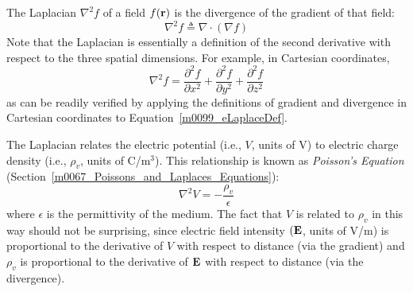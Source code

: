 

\label{m0099_The_Laplacian_Operator} %

The Laplacian $\nabla^2 f$ of a field $f({\bf r})$ is the divergence of the gradient of that field:
%
\begin{equation}
\nabla^2 f \triangleq \nabla\cdot\left(\nabla f\right)
\label{m0099_eLaplaceDef}
\end{equation}
%
Note that the Laplacian is essentially a definition of the second derivative with respect to the three spatial dimensions.
For example, in Cartesian coordinates,
%
\begin{equation}
\nabla^2 f= 
\frac{\partial^2 f}{\partial x^2}  
+ \frac{\partial^2 f}{\partial y^2}  
+ \frac{\partial^2 f}{\partial z^2} 
\label{m0099_eLaplaceScalar} 
\end{equation}
%
as can be readily verified by applying the definitions of gradient and divergence in Cartesian coordinates to Equation~\ref{m0099_eLaplaceDef}.

The Laplacian relates the
electric potential (i.e., $V$, units of V) to electric charge density (i.e., $\rho_v$, units of C/m$^3$).
This relationship is known as {\it Poisson's Equation} 
(Section~\ref{m0067_Poissons_and_Laplaces_Equations}):
%
\begin{equation}
\nabla^2 V = - \frac{\rho_v}{\epsilon}
\end{equation}  
%
where $\epsilon$ is the permittivity of the medium.
The fact that $V$ is related to $\rho_v$ in this way should not be surprising, since electric field intensity $({\bf E}$, units of V/m) is proportional to the derivative of $V$ with respect to distance (via the gradient) and $\rho_v$ is proportional to the derivative of ${\bf E}$ with respect to distance (via the divergence).

